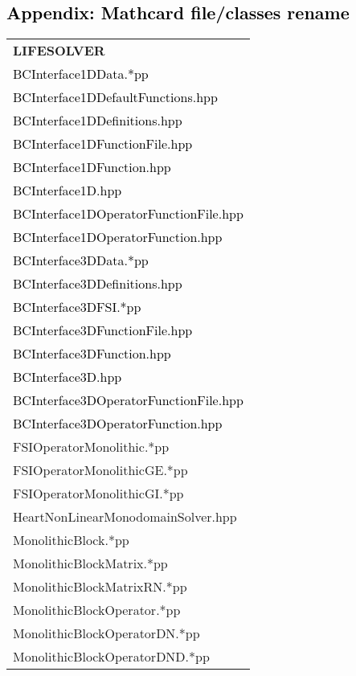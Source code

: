 \documentclass[10p]{article}
\newcommand{\newparts}[1]{\textcolor{black}{#1}}
\newcommand{\newpartsVC}[1]{\textcolor{black}{#1}}
\theoremstyle{definition}
\begin{document}
\newpage
\begin{landscape}
\section*{\newparts{Appendix: Mathcard file/classes rename}}
\begin{table}[!h]
\fontsize{7}{7}\selectfont
\begin{multicols}{3}
\begin{xtabular}{
p{0.36\textwidth}<{}
}
\textbf{LIFESOLVER} \\
\newpartsVC{BCInterface1DData.*pp}\\
\newpartsVC{BCInterface1DDefaultFunctions.hpp}\\
\newpartsVC{BCInterface1DDefinitions.hpp}\\
\newpartsVC{BCInterface1DFunctionFile.hpp}\\
\newpartsVC{BCInterface1DFunction.hpp}\\
\newpartsVC{BCInterface1D.hpp}\\
\newpartsVC{BCInterface1DOperatorFunctionFile.hpp}\\
\newpartsVC{BCInterface1DOperatorFunction.hpp}\\
\newpartsVC{BCInterface3DData.*pp}\\
\newpartsVC{BCInterface3DDefinitions.hpp}\\
\newpartsVC{BCInterface3DFSI.*pp}\\
\newpartsVC{BCInterface3DFunctionFile.hpp}\\
\newpartsVC{BCInterface3DFunction.hpp}\\
\newpartsVC{BCInterface3D.hpp}\\
\newpartsVC{BCInterface3DOperatorFunctionFile.hpp}\\
\newpartsVC{BCInterface3DOperatorFunction.hpp}\\
FSIOperatorMonolithic.*pp\\
FSIOperatorMonolithicGE.*pp\\
FSIOperatorMonolithicGI.*pp\\
HeartNonLinearMonodomainSolver.hpp\\
MonolithicBlock.*pp\\
MonolithicBlockMatrix.*pp\\
MonolithicBlockMatrixRN.*pp\\
MonolithicBlockOperator.*pp\\
MonolithicBlockOperatorDN.*pp\\
MonolithicBlockOperatorDND.*pp\\

\end{xtabular}
\end{multicols}
\end{table}
\end{landscape}
\end{document}
